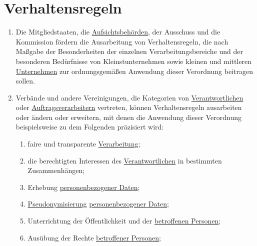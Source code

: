 \chapter{Verhaltensregeln}
\label{ch:40}


\begin{enumerate}

  \item Die Mitgliedstaaten, die \hyperref[itm:04-21]{Aufsichtsbehörden}, der Ausschuss und die Kommission fördern die
   Ausarbeitung von Verhaltensregeln, die nach Maßgabe der Besonderheiten der einzelnen Verarbeitungsbereiche und der
   besonderen Bedürfnisse von Kleinstunternehmen sowie kleinen und mittleren \hyperref[itm:04-18]{Unternehmen} zur
   ordnungsgemäßen Anwendung dieser Verordnung beitragen sollen.%
  \label{itm:40-1}

  \item Verbände und andere Vereinigungen, die Kategorien von \hyperref[itm:04-7]{Verantwortlichen} oder \hyperref
   [itm:04-8]{Auftragsverarbeitern} vertreten, können Verhaltensregeln ausarbeiten oder ändern oder erweitern, mit
   denen die Anwendung dieser Verordnung beispielsweise zu dem Folgenden präzisiert wird:%
  \label{itm:40-2}

  \begin{enumerate}
  
    \item faire und transparente \hyperref[itm:04-2]{Verarbeitung};%
    \label{itm:40-2a}

    \item die berechtigten Interessen des \hyperref[itm:04-7]{Verantwortlichen} in bestimmten Zusammenhängen;%
    \label{itm:40-2b}

    \item Erhebung \hyperref[itm:04-1]{personenbezogener Daten};%
    \label{itm:40-2c}

    \item \hyperref[itm:04-5]{Pseudonymisierung} \hyperref[itm:04-1]{personenbezogener Daten};%
    \label{itm:40-2d}

    \item Unterrichtung der Öffentlichkeit und der \hyperref[itm:04-1]{betroffenen Personen};%
    \label{itm:40-2e}

    \item Ausübung der Rechte \hyperref[itm:04-1]{betroffener Personen};%
    \label{itm:40-2f}


\end{enumerate}
\end{enumerate}
